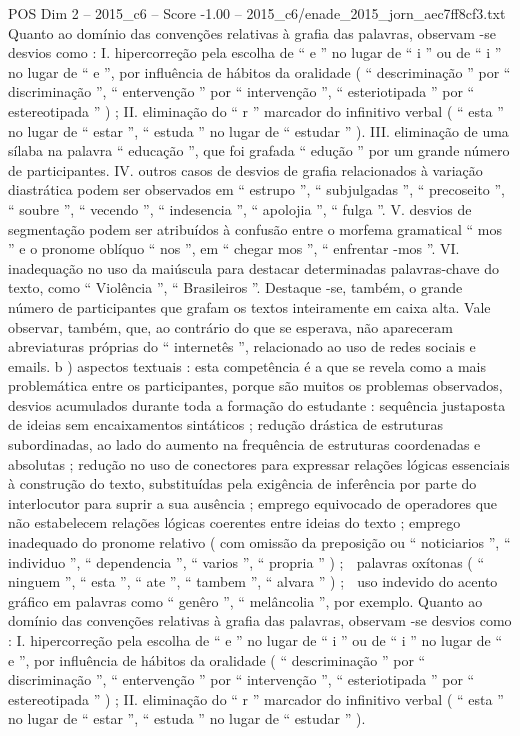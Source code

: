 \begin{textsample}{POS Dim 2 – 2015\_c6 – Score -1.00 – 2015\_c6/enade\_2015\_jorn\_aec7ff8cf3.txt}
Quanto ao domínio das convenções relativas à grafia das palavras, observam -se desvios como : I. hipercorreção pela escolha de “ e ” no lugar de “ i ” ou de “ i ” no lugar de “ e ”, por influência de hábitos da oralidade ( “ descriminação ” por “ discriminação ”, “ entervenção ” por “ intervenção ”, “ esteriotipada ” por “ estereotipada ” ) ; II. eliminação do “ r ” marcador do infinitivo verbal ( “ esta ” no lugar de “ estar ”, “ estuda ” no lugar de “ estudar ” ).
III. eliminação de uma sílaba na palavra “ educação ”, que foi grafada “ edução ” por um grande número de participantes.
IV. outros casos de desvios de grafia relacionados à variação diastrática podem ser observados em “ estrupo ”, “ subjulgadas ”, “ precoseito ”, “ soubre ”, “ vecendo ”, “ indesencia ”, “ apolojia ”, “ fulga ”.
V. desvios de segmentação podem ser atribuídos à confusão entre o morfema gramatical “ mos ” e o pronome oblíquo “ nos ”, em “ chegar mos ”, “ enfrentar -mos ”.
VI. inadequação no uso da maiúscula para destacar determinadas palavras-chave do texto, como “ Violência ”, “ Brasileiros ”.
Destaque -se, também, o grande número de participantes que grafam os textos inteiramente em caixa alta.
Vale observar, também, que, ao contrário do que se esperava, não apareceram abreviaturas próprias do “ internetês ”, relacionado ao uso de redes sociais e emails. b ) aspectos textuais : esta competência é a que se revela como a mais problemática entre os participantes, porque são muitos os problemas observados, desvios acumulados durante toda a formação do estudante : sequência justaposta de ideias sem encaixamentos sintáticos ; redução drástica de estruturas subordinadas, ao lado do aumento na frequência de estruturas coordenadas e absolutas ; redução no uso de conectores para expressar relações lógicas essenciais à construção do texto, substituídas pela exigência de inferência por parte do interlocutor para suprir a sua ausência ; emprego equivocado de operadores que não estabelecem relações lógicas coerentes entre ideias do texto ; emprego inadequado do pronome relativo ( com omissão da preposição ou “ noticiarios ”, “ individuo ”, “ dependencia ”, “ varios ”, “ propria ” ) ;  palavras oxítonas ( “ ninguem ”, “ esta ”, “ ate ”, “ tambem ”, “ alvara ” ) ;  uso indevido do acento gráfico em palavras como “ genêro ”, “ melâncolia ”, por exemplo.
Quanto ao domínio das convenções relativas à grafia das palavras, observam -se desvios como : I. hipercorreção pela escolha de “ e ” no lugar de “ i ” ou de “ i ” no lugar de “ e ”, por influência de hábitos da oralidade ( “ descriminação ” por “ discriminação ”, “ entervenção ” por “ intervenção ”, “ esteriotipada ” por “ estereotipada ” ) ; II. eliminação do “ r ” marcador do infinitivo verbal ( “ esta ” no lugar de “ estar ”, “ estuda ” no lugar de “ estudar ” ).

\end{textsample}
